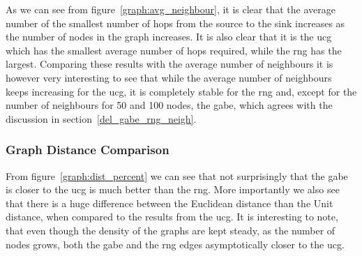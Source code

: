 As we can see from figure~\ref{graph:avg_neighbour}, it is clear that the average number of the smallest number of hops from the source to the sink increases as the number of nodes in the graph increases. It is also clear that it is the \ac{ucg} which has the smallest average number of hops required, while the \ac{rng} has the largest. Comparing these results with the average number of neighbours it is however very interesting to see that while the average number of neighbours keeps increasing for the \ac{ucg}, it is completely stable for the \ac{rng} and, except for the number of neighbours for 50 and 100 nodes, the \ac{gabe}, which agrees with the discussion in section~\ref{del_gabe_rng_neigh}. 

\subsubsection{Graph Distance Comparison}
\label{section:graph_distance_comparison}


From figure~\ref{graph:dist_percent} we can see that not surprisingly that the \ac{gabe} is closer to the \ac{ucg} is much better than the \ac{rng}. More importantly we also see that there is a huge difference between the Euclidean distance than the Unit distance, when compared to the results from the \ac{ucg}. It is interesting to note, that even though the density of the graphs are kept steady, as the number of nodes grows, both the \ac{gabe} and the \ac{rng} edges asymptotically closer to the \ac{ucg}. 


